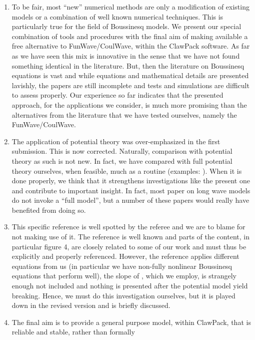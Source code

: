 \documentclass[11pt]{article}
\begin{document}
\begin{enumerate}
\item To be fair, most ``new'' numerical methods are only a modification of existing models or a combination
        of well known numerical techniques. This is particularly true for the field of Boussinesq models. 
      We present our special combination of tools and procedures with the final aim of making available a free 
      alternative to FunWave/CoulWave, within the ClawPack software. As far as we have seen this mix is innovative
      in the sense that we have not found something identical in the literature. But, then the literature on Boussinesq
      equations is vast and while equations and mathematical details are presented lavishly, the papers are
      still incomplete and tests and simulations are difficult to assess properly. Our experience so far indicates 
     that the  presented approach, for the applications we consider, is much more promising than the alternatives 
     from the literature that we have tested ourselves, namely the FunWave/CoulWave. 
\item The application of potential theory was over-emphasized in the first submission.
      This is now corrected. Naturally, comparison with potential theory as such
      is not new. In fact,  we have compared with full potential theory ourselves, when feasible, 
      much as a routine (examples: \cite{Lovholt:2013a,Pedersen:2013}).
      When it is done properly,  we think that  it strengthens investigations like
      the present one and contribute to important insight. In fact,  most paper on long wave models do not
      invoke a ``full model'', but a number of these papers would really have benefited from doing so.
\item This specific reference \cite{wei1995fully} is well spotted by the referee and 
      we are to blame for not making use of it. The reference is well known and parts of the content, 
      in particular figure 4, are closely related to some of our work and must thus be explicitly and properly referenced.
       However, the reference applies different
      equations from us (in particular we have non-fully nonlinear Boussinesq equations that perform well), the slope
      of \cite{synolakis1987runup}, which we employ, is strangely enough not included and nothing is presented
      after the potential model yield breaking. Hence, we must do this investigation ourselves, but it is played down in the revised 
version and  \cite{wei1995fully} is briefly discussed.  
\item The final aim is to provide a general purpose model, within ClawPack, that is reliable and stable, rather than formally 

\end{enumerate}
\end{document}
